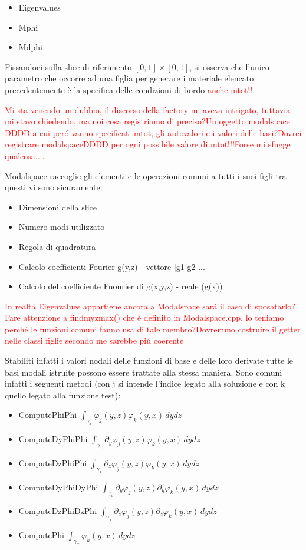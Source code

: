 \begin{itemize}
\item Eigenvalues
\item Mphi
\item Mdphi
\end{itemize}

Fissandoci sulla slice di riferimento $[0,1]\times[0,1]$, si osserva che l'unico parametro che occorre ad una figlia per generare i materiale elencato precedentemente è la specifica delle condizioni di bordo \textcolor{red}{anche mtot!!}.

\textcolor{red}{Mi sta venendo un dubbio, il discorso della factory mi aveva intrigato, tuttavia mi stavo chiedendo, ma noi cosa registriamo di preciso?Un oggetto modalspace DDDD a cui per\'o vanno specificati mtot, gli autovalori e i valori delle basi?Dovrei registrare modalspaceDDDD per ogni possibile valore di mtot!!!Forse mi sfugge qualcosa....}


Modalspace raccoglie gli elementi e le operazioni comuni a tutti i suoi figli tra questi vi sono sicuramente:
\begin{itemize}
\item Dimensioni della slice
\item Numero modi utilizzato
\item Regola di quadratura
\item Calcolo coefficienti Fourier g(y,z) - vettore [g1 g2 ...]
\item Calcolo del coefficiente Fuourier di g(x,y,z) - reale (g(x))
\end{itemize}

\textcolor{red}{In realt\'a Eigenvalues appartiene ancora a Modalspace sar\'a il caso di sposatarlo?Fare attenzione a findmyzmax() che è definito in Modalspace.cpp, lo teniamo perch\'e le funzioni comuni fanno usa di tale membro?Dovremmo costruire il getter nelle classi figlie secondo me sarebbe pi\'u coerente}

Stabiliti infatti i valori nodali delle funzioni di base e delle loro derivate tutte le basi modali istruite possono essere trattate alla stessa maniera. Sono comuni infatti i seguenti metodi (con j si intende l'indice legato alla soluzione e con k quello legato alla funzione test):
\begin{itemize}
\item ComputePhiPhi $\int_{\gamma_x}\varphi_j(y,z)\varphi_k(y,x) \,dydz$
\item ComputeDyPhiPhi $\int_{\gamma_x} \partial_y \varphi_j(y,z)\varphi_k(y,x) \,dydz$
\item ComputeDzPhiPhi
$\int_{\gamma_x} \partial_z \varphi_j(y,z)\varphi_k(y,x) \,dydz$
\item ComputeDyPhiDyPhi $\int_{\gamma_x} \partial_y \varphi_j(y,z)\partial_y\varphi_k(y,x) \,dydz$
\item ComputeDzPhiDzPhi
$\int_{\gamma_x} \partial_z \varphi_j(y,z)\partial_z\varphi_k(y,x) \,dydz$
\item ComputePhi
$\int_{\gamma_x} \varphi_k(y,x) \,dydz$
\end{itemize}

